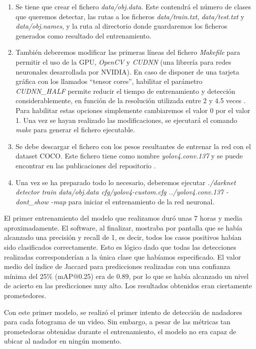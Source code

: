 \begin{enumerate}
    \item Se tiene que crear el fichero \textit{data/obj.data}. Este contendrá el número de clases que queremos detectar, las rutas a los ficheros \textit{data/train.txt}, \textit{data/test.txt} y \textit{data/obj.names}, y la ruta al directorio donde guardaremos los ficheros generados como resultado del entrenamiento.
    
    \item También deberemos modificar las primeras líneas del fichero \textit{Makefile} para permitir el uso de la GPU, \textit{OpenCV} y \textit{CUDNN} (una librería para redes neuronales desarrollada por NVIDIA). En caso de disponer de una tarjeta gráfica con los llamados ``tensor cores'', habilitar el parámetro \textit{CUDNN\_HALF} permite reducir el tiempo de entrenamiento y detección considerablemente, en función de la resolución utilizada entre 2 y 4.5 veces \cite{darknetgithub}. Para habilitar estas opciones simplemente cambiaremos el valor 0 por el valor 1. Una vez se hayan realizado las modificaciones, se ejecutará el comando \textit{make} para generar el fichero ejecutable.
    
    \item Se debe descargar el fichero con los pesos resultantes de entrenar la red con el dataset COCO. Este fichero tiene como nombre \textit{yolov4.conv.137} y se puede encontrar en las publicaciones del repositorio \cite{darknetgithub}.
    
    \item Una vez se ha preparado todo lo necesario, deberemos ejecutar \textit{./darknet detector train data/obj.data cfg/yolov4-custom.cfg ../yolov4.conv.137 -dont\_show -map} para iniciar el entrenamiento de la red neuronal. 
\end{enumerate}

El primer entrenamiento del modelo que realizamos duró unas 7 horas y media aproximadamente. El software, al finalizar, mostraba por pantalla que se había alcanzado una precisión y recall de 1, es decir, todos los casos positivos habían sido clasificados correctamente. Esto es lógico dado que todas las detecciones realizadas corresponderían a la única clase que habíamos especificado. El valor medio del índice de Jaccard para predicciones realizadas con una confianza mínima del 25\% (mAP@0.25) era de 0.89, por lo que se había alcanzado un nivel de acierto en las predicciones muy alto. Los resultados obtenidos eran ciertamente prometedores.

Con este primer modelo, se realizó el primer intento de detección de nadadores para cada fotograma de un video. Sin embargo, a pesar de las métricas tan prometedoras obtenidas durante el entrenamiento, el modelo no era capaz de ubicar al nadador en ningún momento.

